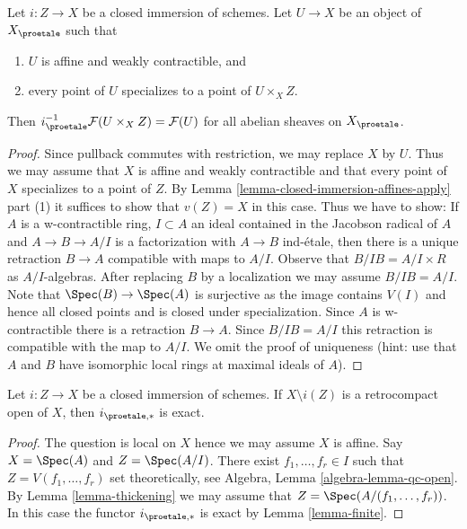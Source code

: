 \begin{lemma}
\label{lemma-compute-i-star}
Let $i : Z \to X$ be a closed immersion of schemes.
Let $U \to X$ be an object of $X_\proetale$ such that
\begin{enumerate}
\item $U$ is affine and weakly contractible, and
\item every point of $U$ specializes to a point of $U \times_X Z$.
\end{enumerate}
Then $i_\proetale^{-1}\mathcal{F}(U \times_X Z) = \mathcal{F}(U)$
for all abelian sheaves on $X_\proetale$.
\end{lemma}

\begin{proof}
Since pullback commutes with restriction, we may replace $X$ by $U$.
Thus we may assume that $X$ is affine and weakly contractible
and that every point of $X$ specializes to a point of $Z$.
By Lemma \ref{lemma-closed-immersion-affines-apply} part (1)
it suffices to show that $v(Z) = X$ in this case.
Thus we have to show: If $A$ is a w-contractible ring, $I \subset A$
an ideal contained in the Jacobson radical of $A$ and $A \to B \to A/I$
is a factorization with $A \to B$ ind-\'etale, then there is
a unique retraction $B \to A$ compatible with maps to $A/I$.
Observe that $B/IB = A/I \times R$ as $A/I$-algebras.
After replacing $B$ by a localization we may assume $B/IB = A/I$.
Note that $\Spec(B) \to \Spec(A)$ is surjective as the image
contains $V(I)$ and hence all closed points and is closed under
specialization. Since $A$ is w-contractible there is a retraction $B \to A$.
Since $B/IB = A/I$ this retraction is compatible with the map to $A/I$.
We omit the proof of uniqueness (hint: use that $A$ and $B$ have
isomorphic local rings at maximal ideals of $A$).
\end{proof}

\begin{lemma}
\label{lemma-closed-immersion-complement-retrocompact-exact}
Let $i : Z \to X$ be a closed immersion of schemes.
If $X \setminus i(Z)$ is a retrocompact open of $X$, then
$i_{\proetale, *}$ is exact.
\end{lemma}

\begin{proof}
The question is local on $X$ hence we may assume $X$ is affine.
Say $X = \Spec(A)$ and $Z = \Spec(A/I)$. There exist
$f_1, \ldots, f_r \in I$ such that $Z = V(f_1, \ldots, f_r)$
set theoretically, see Algebra, Lemma \ref{algebra-lemma-qc-open}.
By Lemma \ref{lemma-thickening} we may assume that
$Z = \Spec(A/(f_1, \ldots, f_r))$. In this case
the functor $i_{\proetale, *}$ is exact by
Lemma \ref{lemma-finite}.
\end{proof}






